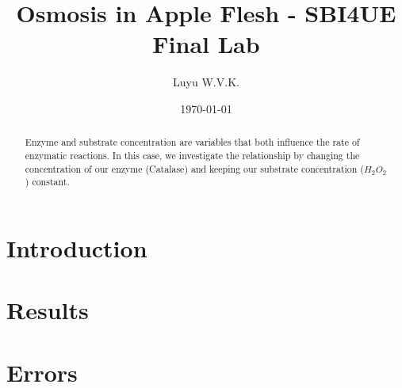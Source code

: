 \documentclass[prl,twocolumn,amsmath,amssymb,superscriptaddress]{revtex4-2}
\begin{document}
\title{Osmosis in Apple Flesh - SBI4UE Final Lab}
\author{Luyu W.V.K.}
\date{\today}

\begin{abstract}
    Enzyme and substrate concentration are variables that both influence the rate of enzymatic reactions. In this case, we investigate the relationship by changing the concentration of our enzyme (Catalase) and keeping our substrate concentration ($H_{2}O_2$) constant.
\end{abstract}
\maketitle

\section{Introduction}

\section{Results}

\section{Errors}
\end{document}
